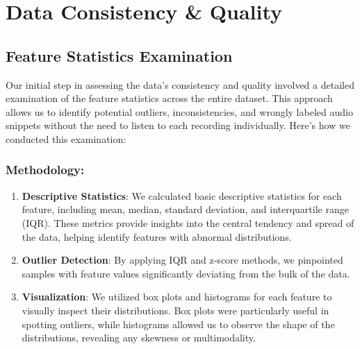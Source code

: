 \section{Data Consistency \& Quality}

\subsection{Feature Statistics Examination}

Our initial step in assessing the data's consistency and quality involved a detailed examination of the feature statistics across the entire dataset. This approach allows us to identify potential outliers, inconsistencies, and wrongly labeled audio snippets without the need to listen to each recording individually. Here's how we conducted this examination:

\subsubsection{Methodology:}

\begin{enumerate}
    \item \textbf{Descriptive Statistics}: We calculated basic descriptive statistics for each feature, including mean, median, standard deviation, and interquartile range (IQR). These metrics provide insights into the central tendency and spread of the data, helping identify features with abnormal distributions.
    \item \textbf{Outlier Detection}: By applying IQR and z-score methods, we pinpointed samples with feature values significantly deviating from the bulk of the data.
    \item \textbf{Visualization}: We utilized box plots and histograms for each feature to visually inspect their distributions. Box plots were particularly useful in spotting outliers, while histograms allowed us to observe the shape of the distributions, revealing any skewness or multimodality.
\end{enumerate}

